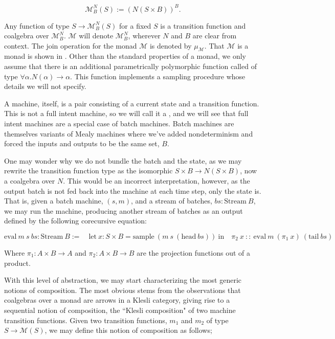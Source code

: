 \begin{equation}\label{eq:M-monad}
    \mathcal{M}_B^N(S) := (N(S\times B))^B.
\end{equation}

Any function of type $S \rightarrow \mathcal{M}_B^N(S)$ for a fixed $S$ is a transition function and coalgebra over $\mathcal{M}_B^N$. $\mathcal{M}$ will denote $\mathcal{M}_B^N$, wherever $N$ and $B$ are clear from context. The join operation for the monad $\mathcal{M}$ is denoted by $\mu_\mathcal{M}$. That $\mathcal{M}$ is a monad is shown
in . Other than the standard properties of a monad, we only assume that there is an additional parametrically polymorphic function \citep{pierce2002types} called  of type $\forall \alpha. N(\alpha) \rightarrow \alpha$. This function implements a sampling procedure whose details we will not specify.

A machine, itself, is a pair consisting of a current state and a transition function. This is not a full intent machine, so we will call it a , and we will see that full intent machines are a special case of batch machines. Batch machines are themselves variants of Mealy machines \citep{bonsangue2008coalgebraic} where we've added nondeterminism and forced the inputs and outputs to be the same set, $B$.

One may wonder why we do not bundle the batch and the state, as we may rewrite the transition function type as the isomorphic $S \times B \rightarrow N(S \times B)$, now a coalgebra over $N$. This would be an incorrect interpretation, however, as the output batch is not fed back into the machine at each time step, only the state is. That is, given a batch machine, $(s, m)$, and a stream of batches, $bs : \text{Stream}\ B$, we may run the machine, producing another stream of batches as an output defined by the following corecursive equation:

\begin{equation}
    \text{eval}\ m\ s\ bs : \text{Stream}\ B :=\quad \text{let}\ x : S \times B = \text{sample}\ (m\ s\ (\text{head}\ bs))\ \text{in}\quad \pi_2\ x\ ::\ \text{eval}\ m\ (\pi_1\ x)\ (\text{tail}\ bs)
\end{equation}

Where $\pi_1 : A \times B \rightarrow A$ and $\pi_2 : A \times B \rightarrow B$ are the projection functions out of a product.

With this level of abstraction, we may start characterizing the most generic notions of composition. The most obvious stems from the observations that coalgebras over a monad are arrows in a Klesli category, giving rise to a sequential notion of composition, the ``Klesli composition" of two machine transition functions. Given two transition functions, $m_1$ and $m_2$
of type $S \to \mathcal{M}(S)$, we may define this notion of composition as follows;

